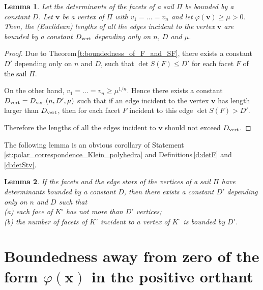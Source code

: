 \documentclass[11pt]{article}
\theoremstyle{definition}
\theoremstyle{remark}
\theoremstyle{plain}
\newtheorem{lemma}{Lemma}
\renewcommand{\vec}[1]{\mathbf{#1}}
\renewcommand{\geq}{\geqslant}
\renewcommand{\leq}{\leqslant}
\newcommand{\sail}{\Pi}
\begin{document}
  \begin{lemma} \label{l:edges_are_short}
    Let the determinants of the facets of a sail $\sail$ be bounded by a constant $D$. Let
    $\vec v$ be a vertex of $\sail$ with $v_1=\ldots=v_n$ and let $\varphi(\vec v)\geq\mu>0$.
    Then, the (Euclidean) lengths of all the edges incident to the vertex $\vec v$ are bounded
    by a constant $D_{\textup{vert}}$ depending only on $n$, $D$ and $\mu$.
  \end{lemma}

  \begin{proof}
    Due to Theorem\,\ref{t:boundedness_of_F_and_SF}, there exists a constant $D'$
    depending only on $n$ and $D$, such that $\det S(F)\leq D'$ for each facet $F$ of the
    sail $\sail$.

    On the other hand, $v_1=\ldots=v_n\geq\mu^{1/n}$. Hence there exists a constant
    $D_{\textup{vert}}=D_{\textup{vert}}(n,D',\mu)$ such that if an edge incident to the
    vertex $\vec v$ has length larger than $D_{\textup{vert}}$, then for each facet $F$
    incident to this edge $\det S(F)>D'$.

    Therefore the lengths of all the edges incident to $\vec v$ should not exceed
    $D_{\textup{vert}}$.
  \end{proof}

  The following lemma is an obvious corollary of
  Statement\,\ref{st:polar_correspondence_Klein_polyhedra} and Definitions\,\ref{d:detF} and
  \ref{d:detStv}.

  \begin{lemma} \label{l:faces_and_vertices_of_K_ast_for_K_with_bounded_dets}
    If the facets and the edge stars of the vertices of a sail $\sail$ have determinants
    bounded by a constant $D$, then there exists a constant $D'$ depending only on $n$ and
    $D$ such that \\
    (a) each face of $K^\circ$ has not more than $D'$ vertices; \\
    (b) the number of facets of $K^\circ$ incident to a vertex of $K^\circ$ is bounded by
    $D'$.
  \end{lemma}




  \section{Boundedness away from zero of the form $\varphi(\vec x)$ in the positive orthant}
\end{document}
